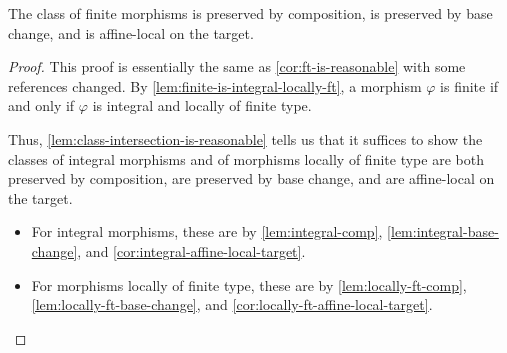 \documentclass[../notes.tex]{subfiles}
\begin{document}
\begin{corollary} \label{cor:finite-is-reasonable}
	The class of finite morphisms is preserved by composition, is preserved by base change, and is affine-local on the target.
\end{corollary}
\begin{proof}
	This proof is essentially the same as \autoref{cor:ft-is-reasonable} with some references changed. By \autoref{lem:finite-is-integral-locally-ft}, a morphism $\varphi$ is finite if and only if $\varphi$ is integral and locally of finite type.
	
	Thus, \autoref{lem:class-intersection-is-reasonable} tells us that it suffices to show the classes of integral morphisms and of morphisms locally of finite type are both preserved by composition, are preserved by base change, and are affine-local on the target.
	\begin{itemize}
		\item For integral morphisms, these are by \autoref{lem:integral-comp}, \autoref{lem:integral-base-change}, and \autoref{cor:integral-affine-local-target}.
		\item For morphisms locally of finite type, these are by \autoref{lem:locally-ft-comp}, \autoref{lem:locally-ft-base-change}, and \autoref{cor:locally-ft-affine-local-target}.
		\qedhere
	\end{itemize}
\end{proof}
\end{document}

